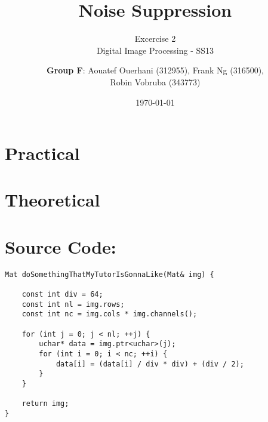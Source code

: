 \documentclass[a4paper,headings=small]{scrartcl}
\title{Noise Suppression}
\subtitle{Excercise 2 \\ Digital Image Processing - SS13}
\author{\textbf{Group F}: Aouatef Ouerhani (312955), Frank Ng (316500),\\ Robin Vobruba (343773)}
\date{\today}
\numberwithin{equation}{section} %
\numberwithin{figure}{section}   %
\begin{document}
\maketitle

\section{Practical}

\section{Theoretical}


\newpage
\section{Source Code:}

\begin{lstlisting}[label=interstingFunction,caption=The function with the color-reduction code.]
Mat doSomethingThatMyTutorIsGonnaLike(Mat& img) {

	const int div = 64;
	const int nl = img.rows;
	const int nc = img.cols * img.channels();

	for (int j = 0; j < nl; ++j) {
		uchar* data = img.ptr<uchar>(j);
		for (int i = 0; i < nc; ++i) {
			data[i] = (data[i] / div * div) + (div / 2);
		}
	}

	return img;
}
\end{lstlisting}

\end{document}
